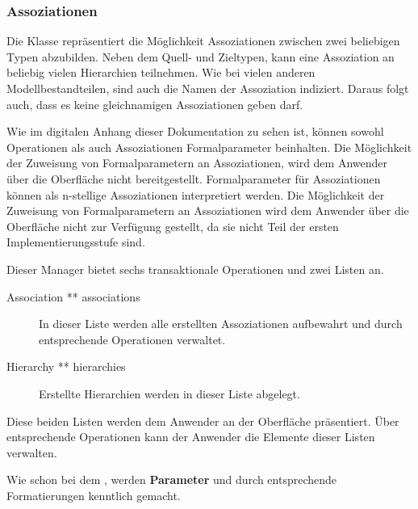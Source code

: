 \begin{description}
\end{description}

\newpage
\subsubsection{Assoziationen}\label{Operation:Associationen}

Die Klasse  repräsentiert die Möglichkeit Assoziationen zwischen zwei beliebigen Typen abzubilden.
Neben dem Quell- und Zieltypen, kann eine Assoziation an beliebig vielen Hierarchien teilnehmen.
Wie bei vielen anderen Modellbestandteilen, sind auch die Namen der Assoziation indiziert. Daraus folgt auch, dass es keine gleichnamigen 
Assoziationen geben darf.

Wie im digitalen Anhang dieser Dokumentation zu sehen ist, können sowohl Operationen als auch Assoziationen Formalparameter beinhalten. Die Möglichkeit der Zuweisung von
Formalparametern an Assoziationen, wird dem Anwender über die Oberfläche nicht bereitgestellt. 
Formalparameter für Assoziationen können als n-stellige Assoziationen interpretiert werden.
Die Möglichkeit der Zuweisung von Formalparametern an Assoziationen wird dem Anwender über die Oberfläche nicht zur Verfügung gestellt, da sie nicht Teil der ersten Implementierungsstufe sind.


Dieser Manager bietet sechs transaktionale Operationen und zwei Listen an.
\begin{description}
\item[Association ** associations] In dieser Liste werden alle erstellten Assoziationen aufbewahrt und durch entsprechende Operationen verwaltet.
\item[Hierarchy ** hierarchies] Erstellte Hierarchien werden in dieser Liste abgelegt.
\end{description}
Diese beiden Listen werden dem Anwender an der 
Oberfläche präsentiert. Über entsprechende Operationen kann der Anwender die Elemente dieser Listen verwalten.

Wie schon bei dem , werden \textbf{Parameter} und  durch entsprechende Formatierungen kenntlich gemacht.

